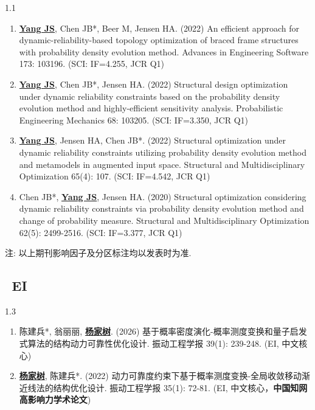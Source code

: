 \documentclass{resume}
\begin{document}
\begin{spacing}{1.1}
\begin{enumerate}[itemsep=5pt,topsep=2pt]
  \item \underline{\textbf{Yang JS}}, Chen JB*, Beer M, Jensen HA. (2022) An efficient approach for dynamic-reliability-based topology optimization of braced frame structures with probability density evolution method. Advances in Engineering Software 173: 103196. (SCI: IF=4.255, JCR Q1)

  \item \underline{\textbf{Yang JS}}, Chen JB*, Jensen HA. (2022) Structural design optimization under dynamic reliability constraints based on the probability density evolution method and highly-efficient sensitivity analysis. Probabilistic Engineering Mechanics 68: 103205. (SCI: IF=3.350, JCR Q1)
  
  \item \underline{\textbf{Yang JS}}, Jensen HA, Chen JB*. (2022) Structural optimization under dynamic reliability constraints utilizing probability density evolution method and metamodels in augmented input space. Structural and Multidisciplinary Optimization 65(4): 107. (SCI: IF=4.542, JCR Q1)
  
  \item Chen JB*, \underline{\textbf{Yang JS}}, Jensen HA. (2020) Structural optimization considering dynamic reliability constraints via probability density evolution method and change of probability measure. Structural and Multidisciplinary Optimization 62(5): 2499-2516. (SCI: IF=3.377, JCR Q1) 
\end{enumerate}
注: 以上期刊影响因子及分区标注均以发表时为准.
\end{spacing}

\subsection{\faFile*\,\; \textbf{EI}}
\begin{spacing}{1.3}
\begin{enumerate} [itemsep=5pt,topsep=2pt]
  \item 陈建兵*, 翁丽丽, \underline{\textbf{杨家树}}. (2026) 基于概率密度演化-概率测度变换和量子启发式算法的结构动力可靠性优化设计. 振动工程学报 39(1): 239-248. (EI, 中文核心)
  
  \item \underline{\textbf{杨家树}}, 陈建兵*. (2022) 动力可靠度约束下基于概率测度变换-全局收敛移动渐近线法的结构优化设计. 振动工程学报 35(1): 72-81. (EI, 中文核心，\textbf{中国知网高影响力学术论文})
\end{enumerate}
\end{spacing}
\end{document}
